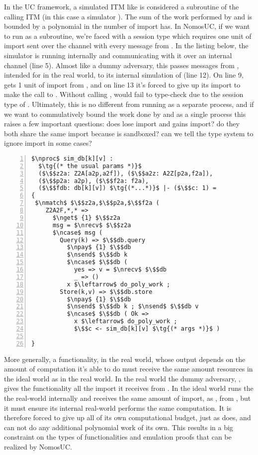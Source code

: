 In the UC framework, a simulated ITM like \Fdb is considered a subroutine of the calling ITM (in this case a simulator \Sim).
The sum of the work performed by \Fdb and \Sim is bounded by a polynomial in the number of import \Sim has.
In NomosUC, if we want to run \Fdb as a subroutine, we're faced with a session type  which requires one unit of import sent over the channel with every message from \Sim.
In the listing below, the simulator is running \Fdb internally and communicating with it over an internal channel  (line 5). 
Almost like a dummy adversary, this \Sim passes messages from \Z, intended for \Fdb in the real world, to its internal simulation of \Fdb (line 12).
On line 9, \Sim gets 1 unit of import from \Z, and on line 13 it's forced to give up its import to make the call to \Fdb.
Without calling \ipay, \Sim would fail to type-check due to the session type of \Fdb.
Ultimately, this is no different from running \Fdb as a separate process, and if we want to commulatively bound the work done by \Fdb and \Sim as a single process this raises a few important questions:
does \Sim lose import and \Fdb gains import? do they both share the same import because \Fdb is sandboxed? can we tell the type system to ignore import in some cases?

\begin{lstlisting}[basicstyle=\scriptsize\BeraMonottFamily, frame=single, mathescape, numbers=left, xleftmargin=2em, xrightmargin=2em]
$\nproc$ sim_db[k][v] : 
  $\tg{(* the usual params *)}$
  ($\$$z2a: Z2A[a2p,a2f]), ($\$$a2z: A2Z[p2a,f2a]),
  ($\$$p2a: a2p), ($\$$f2a: f2a),
  ($\$$fdb: db[k][v]) $\tg{(*...*)}$ |- ($\$$c: 1) =
{
 $\nmatch$ $\$$z2a,$\$$p2a,$\$$f2a (
    Z2A2F,*,* =>
      $\nget$ {1} $\$$z2a
      msg = $\nrecv$ $\$$z2a
      $\ncase$ msg (
        Query(k) => $\$$db.query
          $\npay$ {1} $\$$db
          $\nsend$ $\$$db k
          $\ncase$ $\$$db (
            yes => v = $\nrecv$ $\$$db 
            _ => ()
          x $\leftarrow$ do_poly_work ;
        Store(k,v) => $\$$db.store
          $\npay$ {1} $\$$db
          $\nsend$ $\$$db k ; $\nsend$ $\$$db v
          $\ncase$ $\$$db ( Ok => 
            x $\leftarrow$ do_poly_work ;
            $\$$c <- sim_db[k][v] $\tg{(* args *)}$ )

}
\end{lstlisting}

More generally, a functionality, in the real world, whose output depends on the amount of computation it's able to do must receive the same amount resources in the ideal world as in the real world.
In the real world the dummy adversary, \DA, gives the functionality all the import it receives from \Z.
In the ideal world \Sim runs the the real-world internally and receives the same amount of import, as \DA, from \Z, but it must ensure its internal real-world performs the same computation.
It is therefore forced to give up all of its own computational budget, just as \DA does, and can not do any additional polynomial work of its own. 
This results in a big constraint on the types of functionalities and emulation proofs that can be realized by NomosUC.

